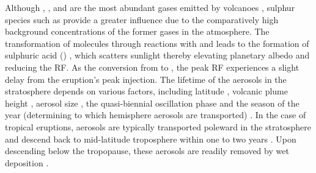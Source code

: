 \documentclass[draft]{agujournal2019}
\begin{document}
  Although , , and  are the most abundant gases emitted by
  volcanoes \cite{robock2000}, sulphur species such as  provide a greater
  influence due to the comparatively high background concentrations of the former gases
  in the atmosphere. The transformation of  molecules through reactions with
   and  leads to the formation of sulphuric acid ()
  \cite{robock2000}, which scatters sunlight thereby elevating planetary albedo and
  reducing the RF. As the conversion from  to 
  ,
  the peak RF experiences a slight delay from the eruption's peak  injection.
  The lifetime of the  aerosols in the stratosphere depends on various
  factors, including latitude \cite{marshall2019, toohey2019}, volcanic plume height
  \cite{marshall2019}, aerosol size \cite{marshall2019}, the quasi-biennial oscillation
  phase \cite{pitari2016b} and the season of the year (determining to which hemisphere
  aerosols are transported) \cite{toohey2011,toohey2019}. In the case of tropical
  eruptions, aerosols are typically transported poleward in the stratosphere and descend
  back to mid-latitude troposphere within one to two years \cite{robock2000}. Upon
  descending below the tropopause, these aerosols are readily removed by wet deposition
  \cite{liu2012}.
\end{document}
